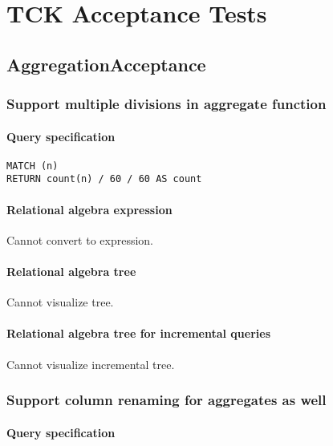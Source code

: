 \chapter{TCK Acceptance Tests}

\section{AggregationAcceptance}

\subsection{Support multiple divisions in aggregate function}

\subsubsection*{Query specification}

\begin{lstlisting}
MATCH (n)
RETURN count(n) / 60 / 60 AS count
\end{lstlisting}

\subsubsection*{Relational algebra expression}

Cannot convert to expression.

\subsubsection*{Relational algebra tree}

Cannot visualize tree.

\subsubsection*{Relational algebra tree for incremental queries}

Cannot visualize incremental tree.

\subsection{Support column renaming for aggregates as well}

\subsubsection*{Query specification}


